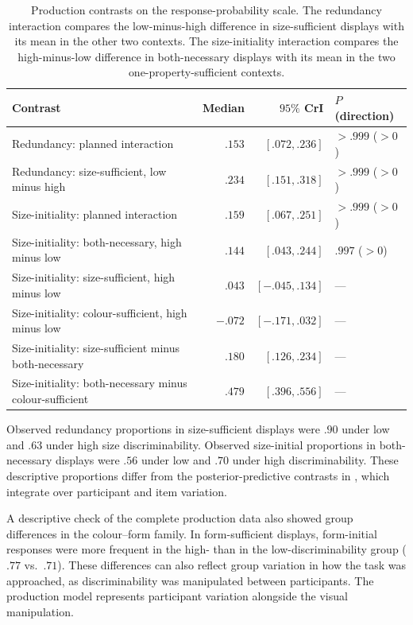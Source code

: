 \documentclass[10pt,a4paper,fleqn]{article}
\begin{document}
\begin{table}[!htbp]
\centering
\small
\caption{Production contrasts on the response-probability scale.
The redundancy interaction compares the low-minus-high difference in size-sufficient displays with its mean in the other two contexts.
The size-initiality interaction compares the high-minus-low difference in both-necessary displays with its mean in the two one-property-sufficient contexts.}
\label{tab:production-behavioural-contrasts}
\begin{tabularx}{\textwidth}{X r r l}
\toprule
Contrast & Median & $95\%$ CrI & $P$ (direction) \\
\midrule
Redundancy: planned interaction & $.153$ & $[.072,.236]$ & $>.999$ ($>0$) \\
Redundancy: size-sufficient, low minus high & $.234$ & $[.151,.318]$ & $>.999$ ($>0$) \\
Size-initiality: planned interaction & $.159$ & $[.067,.251]$ & $>.999$ ($>0$) \\
Size-initiality: both-necessary, high minus low & $.144$ & $[.043,.244]$ & $.997$ ($>0$) \\
Size-initiality: size-sufficient, high minus low & $.043$ & $[-.045,.134]$ & --- \\
Size-initiality: colour-sufficient, high minus low & $-.072$ & $[-.171,.032]$ & --- \\
Size-initiality: size-sufficient minus both-necessary & $.180$ & $[.126,.234]$ & --- \\
Size-initiality: both-necessary minus colour-sufficient & $.479$ & $[.396,.556]$ & --- \\
\bottomrule
\end{tabularx}
\end{table}

Observed redundancy proportions in size-sufficient displays were $.90$ under low and $.63$ under high size discriminability.
Observed size-initial proportions in both-necessary displays were $.56$ under low and $.70$ under high discriminability.
These descriptive proportions differ from the posterior-predictive contrasts in , which integrate over participant and item variation.

A descriptive check of the complete production data also showed group differences in the colour--form family.
In form-sufficient displays, form-initial responses were more frequent in the high- than in the low-discriminability group ($.77$ vs.\ $.71$).
These differences can also reflect group variation in how the task was approached, as discriminability was manipulated between participants.
The production model represents participant variation alongside the visual manipulation.
\end{document}
